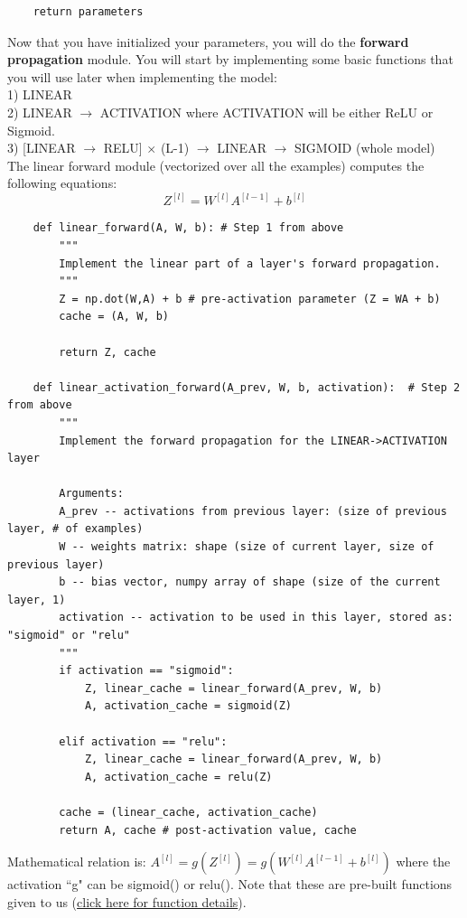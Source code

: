 \documentclass[11pt, a4paper]{article}
\begin{document}
\begin{spacing}{1.1}
\begin{lstlisting}
	return parameters \end{lstlisting}
	Now that you have initialized your parameters, you will do the \textbf{forward propagation} module. You will start by implementing some basic functions that you will use later when implementing the model: \\
	\hspace*{3mm} 1) LINEAR \\
	\hspace*{3mm} 2) LINEAR $\rightarrow$ ACTIVATION where ACTIVATION will be either ReLU or Sigmoid. \\
	\hspace*{3mm} 3) [LINEAR $\rightarrow$ RELU] $\times$ (L-1) $\rightarrow$ LINEAR $\rightarrow$ SIGMOID (whole model) \vspace*{1mm} \\
	The linear forward module (vectorized over all the examples) computes the following equations: $$Z^{[l]} = W^{[l]}A^{[l-1]} +b^{[l]}$$
	\begin{lstlisting}
	def linear_forward(A, W, b): # Step 1 from above
		"""
		Implement the linear part of a layer's forward propagation.
		"""
		Z = np.dot(W,A) + b # pre-activation parameter (Z = WA + b)
		cache = (A, W, b)
		
		return Z, cache
	
	def linear_activation_forward(A_prev, W, b, activation):  # Step 2 from above
		"""
		Implement the forward propagation for the LINEAR->ACTIVATION layer
		
		Arguments:
		A_prev -- activations from previous layer: (size of previous layer, # of examples)
		W -- weights matrix: shape (size of current layer, size of previous layer)
		b -- bias vector, numpy array of shape (size of the current layer, 1)
		activation -- activation to be used in this layer, stored as: "sigmoid" or "relu"
		"""
		if activation == "sigmoid":
			Z, linear_cache = linear_forward(A_prev, W, b)
			A, activation_cache = sigmoid(Z)
		
		elif activation == "relu":
			Z, linear_cache = linear_forward(A_prev, W, b)
			A, activation_cache = relu(Z)
	
		cache = (linear_cache, activation_cache)
		return A, cache # post-activation value, cache \end{lstlisting} \vspace*{1mm}
	Mathematical relation is: $A^{[l]} = g(Z^{[l]}) = g(W^{[l]}A^{[l-1]} +b^{[l]})$ where the activation ``g" can be sigmoid() or relu(). Note that these are pre-built functions given to us (\href{https://www.kaggle.com/kolisnehar/dnn-utils-v2}{click here for function details}).\newpage


\end{spacing}
\end{document}
